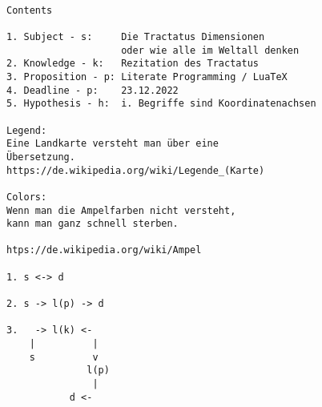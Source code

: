 \documentclass[10pt,a4paper]{article}
\begin{document}
\vskip 16pt


\begin{verbatim}

Contents

1. Subject - s:     Die Tractatus Dimensionen
                    oder wie alle im Weltall denken
2. Knowledge - k:   Rezitation des Tractatus
3. Proposition - p: Literate Programming / LuaTeX
4. Deadline - p:    23.12.2022
5. Hypothesis - h:  i. Begriffe sind Koordinatenachsen

Legend:
Eine Landkarte versteht man über eine
Übersetzung.
https://de.wikipedia.org/wiki/Legende_(Karte)

Colors:
Wenn man die Ampelfarben nicht versteht,
kann man ganz schnell sterben.

htps://de.wikipedia.org/wiki/Ampel

1. s <-> d

2. s -> l(p) -> d

3.   -> l(k) <-
    |          |
    s          v
              l(p)
               |
           d <-

\end{verbatim}
\end{document}
